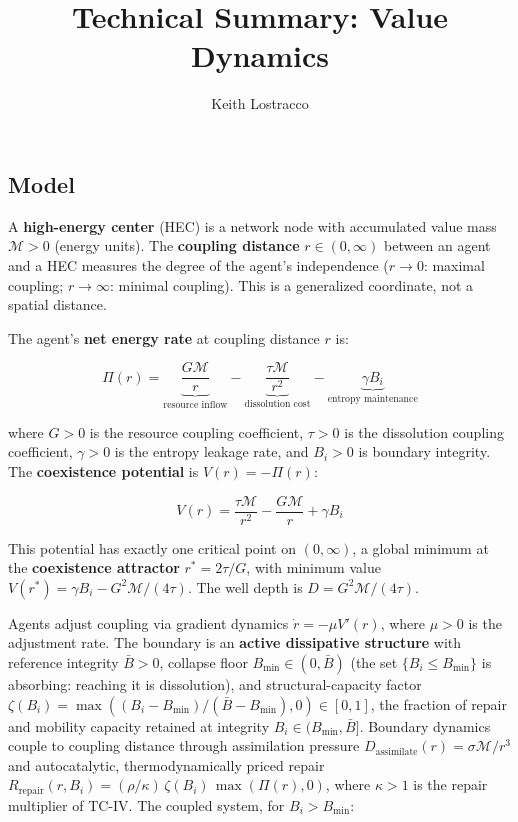 \documentclass[11pt]{article}
\title{Technical Summary: Value Dynamics}
\author{Keith Lostracco}
\date{}
\begin{document}
\maketitle

\subsection{Model}\label{model}

A \textbf{high-energy center} (HEC) is a network node with accumulated
value mass \(\mathcal{M} > 0\) (energy units). The \textbf{coupling
distance} \(r \in (0, \infty)\) between an agent and a HEC measures the
degree of the agent's independence (\(r \to 0\): maximal coupling;
\(r \to \infty\): minimal coupling). This is a generalized coordinate,
not a spatial distance.

The agent's \textbf{net energy rate} at coupling distance \(r\) is:

\[\Pi(r) = \underbrace{\frac{G\mathcal{M}}{r}}_{\text{resource inflow}} - \underbrace{\frac{\tau\mathcal{M}}{r^2}}_{\text{dissolution cost}} - \underbrace{\gamma B_i}_{\text{entropy maintenance}}\]

where \(G > 0\) is the resource coupling coefficient, \(\tau > 0\) is
the dissolution coupling coefficient, \(\gamma > 0\) is the entropy
leakage rate, and \(B_i > 0\) is boundary integrity. The
\textbf{coexistence potential} is \(V(r) = -\Pi(r)\):

\[V(r) = \frac{\tau\mathcal{M}}{r^2} - \frac{G\mathcal{M}}{r} + \gamma B_i\]

This potential has exactly one critical point on \((0, \infty)\), a
global minimum at the \textbf{coexistence attractor} \(r^* = 2\tau/G\),
with minimum value \(V(r^*) = \gamma B_i - G^2\mathcal{M}/(4\tau)\). The
well depth is \(D = G^2\mathcal{M}/(4\tau)\).

Agents adjust coupling via gradient dynamics \(\dot{r} = -\mu V'(r)\),
where \(\mu > 0\) is the adjustment rate. The boundary is an
\textbf{active dissipative structure} with reference integrity
\(\bar{B} > 0\), collapse floor \(B_{\min} \in (0, \bar{B})\) (the set
\(\{B_i \leq B_{\min}\}\) is absorbing: reaching it is dissolution), and
structural-capacity factor
\(\zeta(B_i) = \max((B_i - B_{\min})/(\bar{B} - B_{\min}), 0) \in [0, 1]\),
the fraction of repair and mobility capacity retained at integrity
\(B_i \in (B_{\min}, \bar{B}]\). Boundary dynamics couple to coupling
distance through assimilation pressure
\(D_{\text{assimilate}}(r) = \sigma\mathcal{M}/r^3\) and autocatalytic,
thermodynamically priced repair
\(R_{\text{repair}}(r, B_i) = (\rho/\kappa)\,\zeta(B_i)\,\max(\Pi(r), 0)\),
where \(\kappa > 1\) is the repair multiplier of TC-IV. The coupled
system, for \(B_i > B_{\min}\):
\end{document}
